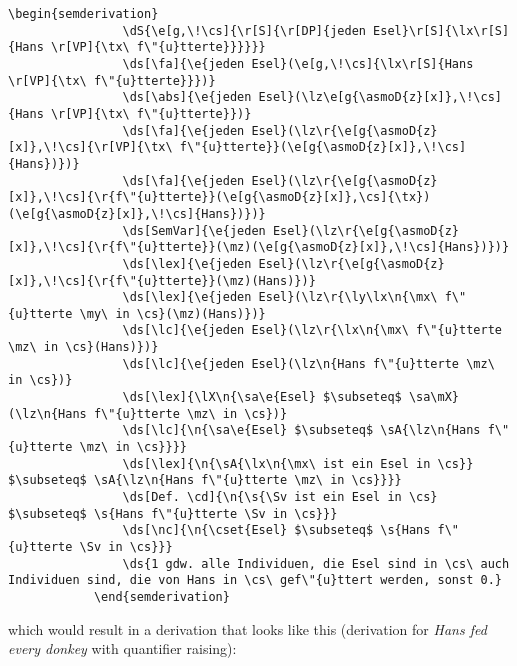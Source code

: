 \documentclass[10pt, a4paper]{article}
\begin{document}
	\begin{lstlisting}[style=B]
			\begin{semderivation}
				\dS{\e[g,\!\cs]{\r[S]{\r[DP]{jeden Esel}\r[S]{\lx\r[S]{Hans \r[VP]{\tx\ f\"{u}tterte}}}}}}
				\ds[\fa]{\e{jeden Esel}(\e[g,\!\cs]{\lx\r[S]{Hans \r[VP]{\tx\ f\"{u}tterte}}})}
				\ds[\abs]{\e{jeden Esel}(\lz\e[g{\asmoD{z}[x]},\!\cs]{Hans \r[VP]{\tx\ f\"{u}tterte}})}
				\ds[\fa]{\e{jeden Esel}(\lz\r{\e[g{\asmoD{z}[x]},\!\cs]{\r[VP]{\tx\ f\"{u}tterte}}(\e[g{\asmoD{z}[x]},\!\cs]{Hans})})}
				\ds[\fa]{\e{jeden Esel}(\lz\r{\e[g{\asmoD{z}[x]},\!\cs]{\r{f\"{u}tterte}}(\e[g{\asmoD{z}[x]},\cs]{\tx})(\e[g{\asmoD{z}[x]},\!\cs]{Hans})})}
				\ds[SemVar]{\e{jeden Esel}(\lz\r{\e[g{\asmoD{z}[x]},\!\cs]{\r{f\"{u}tterte}}(\mz)(\e[g{\asmoD{z}[x]},\!\cs]{Hans})})}
				\ds[\lex]{\e{jeden Esel}(\lz\r{\e[g{\asmoD{z}[x]},\!\cs]{\r{f\"{u}tterte}}(\mz)(Hans)})}
				\ds[\lex]{\e{jeden Esel}(\lz\r{\ly\lx\n{\mx\ f\"{u}tterte \my\ in \cs}(\mz)(Hans)})}
				\ds[\lc]{\e{jeden Esel}(\lz\r{\lx\n{\mx\ f\"{u}tterte \mz\ in \cs}(Hans)})}
				\ds[\lc]{\e{jeden Esel}(\lz\n{Hans f\"{u}tterte \mz\ in \cs})}
				\ds[\lex]{\lX\n{\sa\e{Esel} $\subseteq$ \sa\mX}(\lz\n{Hans f\"{u}tterte \mz\ in \cs})}
				\ds[\lc]{\n{\sa\e{Esel} $\subseteq$ \sA{\lz\n{Hans f\"{u}tterte \mz\ in \cs}}}}
				\ds[\lex]{\n{\sA{\lx\n{\mx\ ist ein Esel in \cs}} $\subseteq$ \sA{\lz\n{Hans f\"{u}tterte \mz\ in \cs}}}}
				\ds[Def. \cd]{\n{\s{\Sv ist ein Esel in \cs} $\subseteq$ \s{Hans f\"{u}tterte \Sv in \cs}}}
				\ds[\nc]{\n{\cset{Esel} $\subseteq$ \s{Hans f\"{u}tterte \Sv in \cs}}}
				\ds{1 gdw. alle Individuen, die Esel sind in \cs\ auch Individuen sind, die von Hans in \cs\ gef\"{u}ttert werden, sonst 0.}
			\end{semderivation}
	\end{lstlisting}
	which would result in a derivation that looks like this (derivation for \textit{Hans fed every donkey} with quantifier raising):
\end{document}
